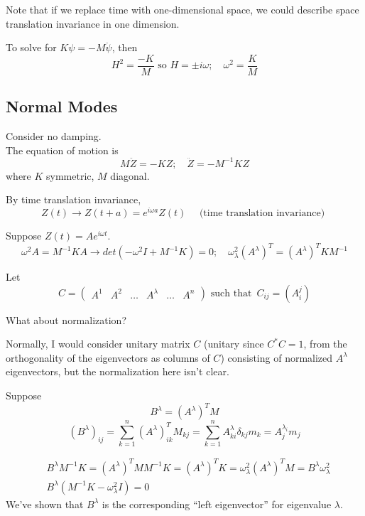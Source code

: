 \documentclass[twoside, 10pt]{amsart}
\begin{document}
Note that if we replace time with one-dimensional space, we could describe space translation invariance in one dimension.  

To solve for $K \psi = - M \ddot{\psi}$, then 
\[
H^2 = \frac{-K}{M} \text{ so } H = \pm i \omega; \quad \omega^2 = \frac{K}{M}
\]

\subsection{ Normal Modes }

Consider no damping.  \medskip \\
The equation of motion is 
\begin{equation}
M \ddot{Z} = - K Z ; \quad \ddot{Z} = - M^{-1} KZ 
\end{equation}
where $K$ symmetric, $M$ diagonal.  

By time translation invariance,
\begin{equation}
  Z(t) \to Z(t+a) = e^{i\omega a} Z(t)  \quad \text{ (time translation invariance) }
\end{equation}

Suppose $Z(t) = Ae^{i\omega t}$.  
\[
\omega^2 A = M^{-1}KA \to det( -\omega^2 I + M^{-1}K) = 0; \quad \omega_{\lambda}^2 (A^{\lambda})^T = (A^{\lambda})^T KM^{-1}  
\]

Let 
\[
C = \left( \begin{matrix} A^{1} & A^{2} & \dots & A^{\lambda} & \dots & A^{n} \end{matrix} \right) \text{ such that } \, C_{ij} = (A_i^{j})
\]

What about normalization?

Normally, I would consider unitary matrix $C$ (unitary since $C^* C = 1$, from the orthogonality of the eigenvectors as columns of $C$) consisting of normalized $A^{\lambda}$ eigenvectors, but the normalization here isn't clear.

Suppose 
\begin{equation}
B^{\lambda} =  (A^{\lambda})^T M
\end{equation}
\[
(B^{\lambda})_{ij} = \sum_{k=1}^n (A^{\lambda})_{ik}^T M_{kj} = \sum_{k=1}^n A_{ki}^{\lambda} \delta_{kj} m_k = A_j^{\lambda_i} m_j 
\]

\[
\begin{aligned}
  & B^{\lambda}M^{-1} K = (A^{\lambda})^T MM^{-1} K =  (A^{\lambda})^T K = \omega_{\lambda}^2 (A^{\lambda})^T M = B^{\lambda} \omega_{\lambda}^2 \\
  & B^{\lambda} (M^{-1} K - \omega_{\lambda}^2 I ) = 0 
\end{aligned} 
\]
We've shown that $B^{\lambda}$ is the corresponding ``left eigenvector'' for eigenvalue $\lambda$.  
\end{document}
